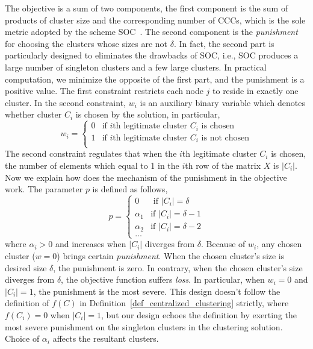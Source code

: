 \documentclass[10pt,journal,compsoc]{IEEEtran}
\theoremstyle{mytheoremstyle}
\theoremstyle{mytheoremstyle}
\theoremstyle{mytheoremstyle}
\newcommand{\ie}{i.e., }
\begin{document}
The objective is a sum of two components, the first component is the sum of products of cluster size and the corresponding number of CCCs, which is the sole metric adopted by the scheme SOC~\cite{LIU_TMC11_2}.
The second component is the \textit{punishment} for choosing the clusters whose sizes are not $\delta$.
In fact, the second part is particularly designed to eliminates the drawbacks of SOC, \ie SOC produces a large number of singleton clusters and a few large clusters.
In practical computation, we minimize the opposite of the first part, and the punishment is a positive value.
%
The first constraint restricts each node $j$ to reside in exactly one cluster.
In the second constraint, $w_i$ is an auxiliary binary variable which denotes whether cluster $C_i$ is chosen by the solution, in particular, 
$$
w_i = \left\{ \begin{array}{rl}
0 &\mbox{if $i$th legitimate cluster $C_i$ is chosen} \\
1 &\mbox{if $i$th legitimate cluster $C_i$ is not chosen} \\
\end{array} \right.
$$
The second constraint regulates that when the $i$th legitimate cluster $C_i$ is chosen, the number of elements which equal to 1 in the $i$th row of the matrix $X$ is $|C_i|$.
%
Now we explain how does the mechanism of the punishment in the objective work. 
The parameter $p$ is defined as follows,
$$
p = \left\{ \begin{array}{rl}
0 &\mbox{ if $|C_i|=\delta$} \\
\alpha_1 &\mbox{if $|C_i|=\delta-1$} \\
\alpha_2 &\mbox{if $|C_i|=\delta-2$} \\
\dots
\end{array} \right.
$$
where $\alpha_i>0$ and increases when $|C_i|$ diverges from $\delta$.
Because of $w_i$, any chosen cluster ($w=0$) brings certain \textit{punishment}.
When the chosen cluster's size is desired size $\delta$, the punishment is zero.
In contrary, when the chosen cluster's size diverges from $\delta$, the objective function suffers \textit{loss}.
In particular, when $w_i=0$ and $|C_i|=1$, the punishment is the most severe.
This design doesn't follow the definition of $f(C)$ in Definition~\ref{def_centralized_clustering} strictly, where $f(C_i)=0$ when $|C_i|=1$, but our design echoes the definition by exerting the most severe punishment on the singleton clusters in the clustering solution.
Choice of $\alpha_i$ affects the resultant clusters.
\end{document}
